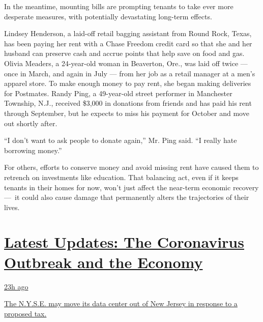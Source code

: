 In the meantime, mounting bills are prompting tenants to take ever more
desperate measures, with potentially devastating long-term effects.

Lindsey Henderson, a laid-off retail bagging assistant from Round Rock,
Texas, has been paying her rent with a Chase Freedom credit card so that
she and her husband can preserve cash and accrue points that help save
on food and gas. Olivia Meaders, a 24-year-old woman in Beaverton, Ore.,
was laid off twice --- once in March, and again in July --- from her job
as a retail manager at a men's apparel store. To make enough money to
pay rent, she began making deliveries for Postmates. Randy Ping, a
49-year-old street performer in Manchester Township, N.J., received
\$3,000 in donations from friends and has paid his rent through
September, but he expects to miss his payment for October and move out
shortly after.

``I don't want to ask people to donate again,'' Mr. Ping said. ``I
really hate borrowing money.''

For others, efforts to conserve money and avoid missing rent have caused
them to retrench on investments like education. That balancing act, even
if it keeps tenants in their homes for now, won't just affect the
near-term economic recovery ---~it could also cause damage that
permanently alters the trajectories of their lives.

\hypertarget{latest-updates-the-coronavirus-outbreak-and-the-economy}{%
\section{\texorpdfstring{\href{https://www.nytimes3xbfgragh.onion/live/2020/09/11/business/stock-market-today-coronavirus?action=click\&pgtype=Article\&state=default\&region=MAIN_CONTENT_1\&context=storylines_live_updates}{Latest
Updates: The Coronavirus Outbreak and the
Economy}}{Latest Updates: The Coronavirus Outbreak and the Economy}}\label{latest-updates-the-coronavirus-outbreak-and-the-economy}}

\href{https://www.nytimes3xbfgragh.onion/live/2020/09/11/business/stock-market-today-coronavirus?action=click\&pgtype=Article\&state=default\&region=MAIN_CONTENT_1\&context=storylines_live_updates\#the-nyse-may-move-its-data-center-out-of-new-jersey-in-response-to-a-proposed-tax}{23h
ago}

\href{https://www.nytimes3xbfgragh.onion/live/2020/09/11/business/stock-market-today-coronavirus?action=click\&pgtype=Article\&state=default\&region=MAIN_CONTENT_1\&context=storylines_live_updates\#the-nyse-may-move-its-data-center-out-of-new-jersey-in-response-to-a-proposed-tax}{The
N.Y.S.E. may move its data center out of New Jersey in response to a
proposed tax.}

